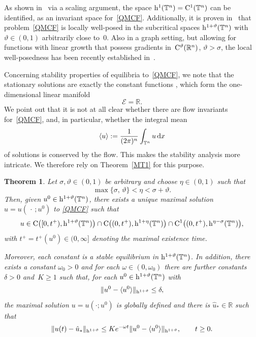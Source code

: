 \documentclass[reqno,11pt]{amsart}
\numberwithin{equation}{section}
\newcommand{\R}{\mathbb{R}}
\newtheorem{thm}{Theorem}[section]
\theoremstyle{remark}
\begin{document}
As shown in~\cite{MW_2025_Annali}  via a scaling argument, the space ${\rm h}^{1}(\mathbb{T}^n)={\rm C}^{1}(\mathbb{T}^n)$ can be identified, as an 
invariant space for~\eqref{QMCF}. Additionally, it is proven in~\cite{MW_2025_Annali} that problem~\eqref{QMCF} is locally well-posed in the subcritical spaces ${\rm h}^{1+\vartheta}(\mathbb{T}^n)$ 
with $\vartheta\in(0,1)$ arbitrarily close to~$0$. Also in a graph setting, but allowing for 
functions with linear growth that possess gradients in~${\rm C}^{\vartheta}(\mathbb{R}^n)$, $\vartheta>\sigma$, the local well-posedness has been recently established in~\cite{AFW24}.

Concerning stability properties of equilibria to~\eqref{QMCF}, we note that the stationary solutions 
are exactly the constant functions \cite{AFW24, MW_2025_Annali}, which form the one-dimensional linear manifold
\begin{equation}\label{eqex1}
\mathcal{E}=\R.
\end{equation}
We point out that it is not at all clear whether there are flow invariants for~\eqref{QMCF}, and, in particular, whether
 the integral mean 
$$
\langle u\rangle :=\frac{1}{(2\pi)^n}\int_{\mathbb{T}^n} u\,{\rm d}x
$$
of solutions is conserved by the flow. This makes the stability analysis more
intricate.
We therefore rely on Theorem~\ref{MT1} for this purpose.


\begin{thm}\label{T:Ex1}
Let $\sigma,\vartheta\in(0,1)$ be arbitrary and choose $\eta\in(0,1)$ such that
\begin{equation}\label{exponents}
\max\{\sigma,\,\vartheta\}<\eta<\sigma+\vartheta.
\end{equation}
Then, given $u^0\in{\rm h}^{1+\vartheta}(\mathbb{T}^n)$, there exists a unique maximal solution 
$u=u(\,\cdot\,;u^0)$ to \eqref{QMCF} such that
\begin{equation}\label{Ex1:WP}
u\in {\rm C}\big([0,t^+),{\rm h}^{1+\vartheta}(\mathbb{T}^n)\big) \cap {\rm C}\big((0,t^+),{\rm h}^{1+\eta}(\mathbb{T}^n)\big)
   \cap {\rm C}^1\big((0,t^+),{\rm h}^{\eta-\sigma}(\mathbb{T}^n)\big),
\end{equation}
with $t^+=t^+(u^0)\in(0,\infty]$ denoting the maximal existence time.

Moreover, each constant is a stable equilibrium in ${\rm h}^{1+\vartheta}(\mathbb{T}^n)$. 
In addition, there exists a constant $\omega_0>0$ and for each $\omega\in(0,\omega_0)$ there are further constants~$\delta>0$ and~$K\geq1$  such  that, for each 
$u^0\in{\rm h}^{1+\vartheta}(\mathbb{T}^n)$ with
\[
\|u^0-\langle u^0\rangle\|_{{\rm h}^{1+\vartheta}}\leq \delta,
\]
the maximal solution $u=u(\cdot;u^0)$ is globally defined and there is 
$\hat u_*\in\R$ such that 
\begin{equation}\label{Ex1:st}
\|u(t)-\hat u_*\|_{{\rm h}^{1+\vartheta}}\leq K e^{-\omega t}\|u^0-\langle u^0\rangle\|_{{\rm h}^{1+\vartheta}},\qquad t\geq0.
\end{equation}
\end{thm}
\end{document}
